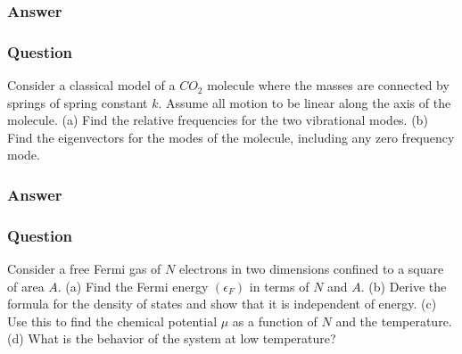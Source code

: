\subsubsection{Answer}



\subsubsection{Question}
Consider a classical model of a $CO_2$ molecule where the masses are connected by springs of spring constant $k$. Assume all motion to be linear along the axis of the molecule. (a) Find the relative frequencies for the two vibrational modes. (b) Find the eigenvectors for the modes of the molecule, including any zero frequency mode.
\subsubsection{Answer}



\subsubsection{Question}
Consider a free Fermi gas of $N$ electrons in two dimensions confined to a square of area $A$. (a) Find the Fermi energy $(\epsilon_F)$ in terms of $N$ and $A$. (b) Derive the formula for the density of states and show that it is independent of energy. (c) Use this to find the chemical potential $\mu$ as a function of $N$ and the temperature. (d) What is the behavior of the system at low temperature?
